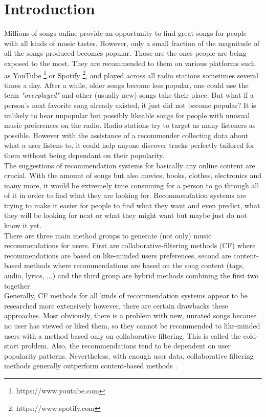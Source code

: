 \chapter{Introduction}

Millions of songs online provide an opportunity to find great songs for people with all kinds of music tastes. However, only a small fraction of the magnitude of all the songs produced becomes popular. Those are the ones people are being exposed to the most. They are recommended to them on various platforms such as YouTube \footnote{https://www.youtube.com} or Spotify \footnote{https://www.spotify.com}, and played across all radio stations sometimes several times a day. After a while, older songs become less popular, one could use the term \textit{"overplayed"} and other (usually new) songs take their place. But what if a person's next favorite song already existed, it just did not become popular? It is unlikely to hear unpopular but possibly likeable songs for people with unusual music preferences on the radio. Radio stations try to target as many listeners as possible. However with the assistance of a recommender collecting data about what a user listens to, it could help anyone discover tracks perfectly tailored for them without being dependant on their popularity.\\
The suggestions of recommendation systems for basically any online content are crucial. With the amount of songs but also movies, books, clothes, electronics and many more, it would be extremely time consuming for a person to go through all of it in order to find what they are looking for. Recommendation systems are trying to make it easier for people to find what they want and even predict, what they will be looking for next or what they might want but maybe just do not know it yet. \\
There are three main method groups to generate (not only) music recommendations for users. First are collaborative-filtering methods (CF) where recommendations are based on like-minded users preferences, second are content-based methods where recommendations are based on the song content (tags, audio, lyrics, ...) and the third group are hybrid methods combining the first two together. \\
Generally, CF methods for all kinds of recommendation systems appear to be researched more extensively \cite{DBLP:journals/corr/abs-1712-07525} however, there are certain drawbacks these approaches. Most obviously, there is a problem with new, unrated songs because no user has viewed or liked them, so they cannot be recommended to like-minded users with a method based only on collaborative filtering. This is called the cold-start problem. Also, the recommendations tend to be dependent on user popularity patterns. Nevertheless, with enough user data, collaborative filtering methods generally outperform content-based methods \cite{van2013deep}. \\
